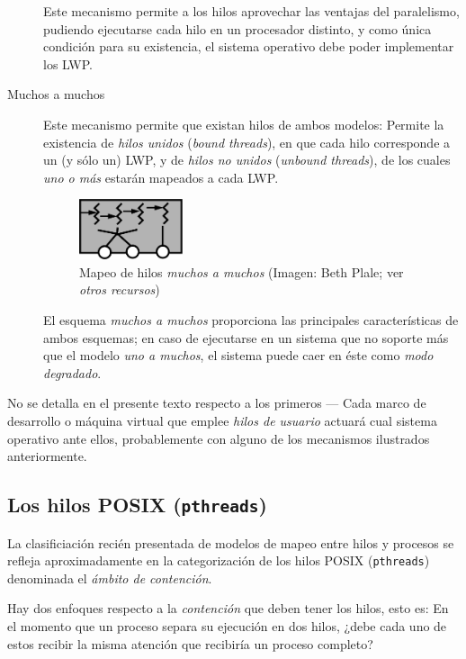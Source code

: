 \documentclass[11pt,fleqn]{book} %
\begin{document}
\begin{description}
	       Este mecanismo permite a los hilos aprovechar las
               ventajas del paralelismo, pudiendo ejecutarse cada hilo
               en un procesador distinto, y como única condición para
               su existencia, el sistema operativo debe poder
               implementar los LWP.
\item[Muchos a muchos] Este mecanismo permite que existan hilos de ambos
     modelos: Permite la existencia de \emph{hilos unidos} (\emph{bound      threads}), en que cada hilo corresponde a un (y sólo un) LWP, y
     de \emph{hilos no unidos} (\emph{unbound threads}), de los cuales \emph{uno o      más} estarán mapeados a cada LWP.

     \begin{figure}[htb]
     \centering
     \includegraphics[width=0.3\textwidth]{./img/hilos_muchos_a_muchos.png}
     \caption{\label{PLAN_hilos_muchos_a_muchos}Mapeo de hilos \emph{muchos a muchos} (Imagen: Beth Plale; ver \emph{otros recursos})}
     \end{figure}

     El esquema \emph{muchos a muchos} proporciona las principales
     características de ambos esquemas; en caso de ejecutarse en un
     sistema que no soporte más que el modelo \emph{uno a muchos}, el
     sistema puede caer en éste como \emph{modo degradado}.
\end{description}

No se detalla en el presente texto respecto a los primeros — Cada marco de
desarrollo o máquina virtual que emplee \emph{hilos de usuario}
actuará cual sistema operativo ante ellos, probablemente con alguno
de los mecanismos ilustrados anteriormente.
\subsection{Los hilos POSIX (\texttt{pthreads})}
\label{sec-4-3-1}


La clasificiación recién presentada de modelos de mapeo entre hilos y
procesos se refleja aproximadamente en la categorización de los hilos
POSIX (\texttt{pthreads}) denominada el \emph{ámbito de contención}.

Hay dos enfoques respecto a la \emph{contención} que deben tener los
hilos, esto es: En el momento que un proceso separa su ejecución en
dos hilos, ¿debe cada uno de estos recibir la misma atención que
recibiría un proceso completo?
\end{document}
